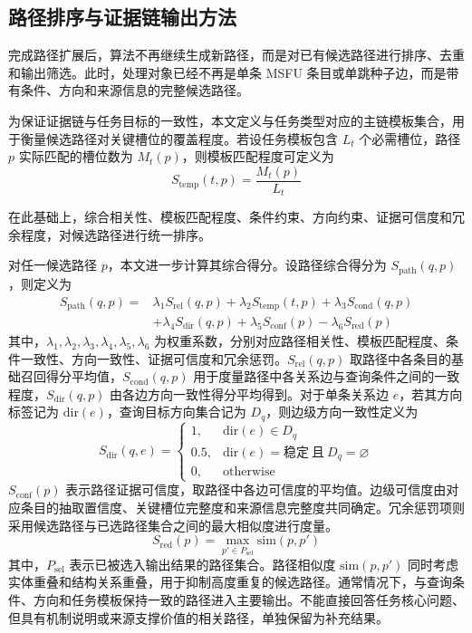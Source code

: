 \subsection{路径排序与证据链输出方法}

完成路径扩展后，算法不再继续生成新路径，而是对已有候选路径进行排序、去重和输出筛选。此时，处理对象已经不再是单条 MSFU 条目或单跳种子边，而是带有条件、方向和来源信息的完整候选路径。

为保证证据链与任务目标的一致性，本文定义与任务类型对应的主链模板集合，用于衡量候选路径对关键槽位的覆盖程度。若设任务模板包含 $L_t$ 个必需槽位，路径 $p$ 实际匹配的槽位数为 $M_t(p)$，则模板匹配程度可定义为
\begin{equation}
    S_{\mathrm{temp}}(t,p)=\frac{M_t(p)}{L_t}
\end{equation}

在此基础上，综合相关性、模板匹配程度、条件约束、方向约束、证据可信度和冗余程度，对候选路径进行统一排序。

对任一候选路径 $p$，本文进一步计算其综合得分。设路径综合得分为 $S_{\mathrm{path}}(q,p)$，则定义为
\begin{equation}
    \begin{aligned}
        S_{\mathrm{path}}(q,p)=&\lambda_1 S_{\mathrm{rel}}(q,p)+\lambda_2 S_{\mathrm{temp}}(t,p)+\lambda_3 S_{\mathrm{cond}}(q,p) \\
        &+\lambda_4 S_{\mathrm{dir}}(q,p)+\lambda_5 S_{\mathrm{conf}}(p)-\lambda_6 S_{\mathrm{red}}(p)
    \end{aligned}
\end{equation}
其中，$\lambda_1,\lambda_2,\lambda_3,\lambda_4,\lambda_5,\lambda_6$ 为权重系数，分别对应路径相关性、模板匹配程度、条件一致性、方向一致性、证据可信度和冗余惩罚。$S_{\mathrm{rel}}(q,p)$ 取路径中各条目的基础召回得分平均值，$S_{\mathrm{cond}}(q,p)$ 用于度量路径中各关系边与查询条件之间的一致程度，$S_{\mathrm{dir}}(q,p)$ 由各边方向一致性得分平均得到。对于单条关系边 $e$，若其方向标签记为 $\mathrm{dir}(e)$，查询目标方向集合记为 $D_q$，则边级方向一致性定义为
\begin{equation}
    S_{\mathrm{dir}}(q,e)=
    \begin{cases}
        1, & \mathrm{dir}(e)\in D_q \\
        0.5, & \mathrm{dir}(e)=\text{稳定}\ \text{且}\ D_q=\varnothing \\
        0, & \text{otherwise}
    \end{cases}
\end{equation}
$S_{\mathrm{conf}}(p)$ 表示路径证据可信度，取路径中各边可信度的平均值。边级可信度由对应条目的抽取置信度、关键槽位完整度和来源信息完整度共同确定。冗余惩罚项则采用候选路径与已选路径集合之间的最大相似度进行度量。
\begin{equation}
    S_{\mathrm{red}}(p)=\max_{p'\in P_{\mathrm{sel}}}\mathrm{sim}(p,p')
\end{equation}
其中，$P_{\mathrm{sel}}$ 表示已被选入输出结果的路径集合。路径相似度 $\mathrm{sim}(p,p')$ 同时考虑实体重叠和结构关系重叠，用于抑制高度重复的候选路径。通常情况下，与查询条件、方向和任务模板保持一致的路径进入主要输出。不能直接回答任务核心问题、但具有机制说明或来源支撑价值的相关路径，单独保留为补充结果。

